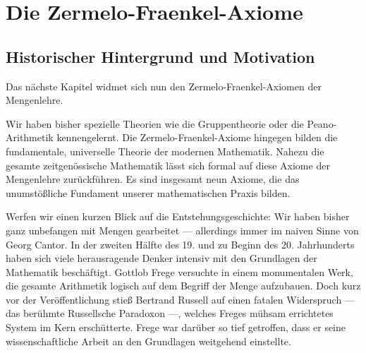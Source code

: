 \begin{ai-global-state-checkpoint-invisible-content}
\end{ai-global-state-checkpoint-invisible-content}

\section{Die Zermelo-Fraenkel-Axiome}
\subsection{Historischer Hintergrund und Motivation}

\begin{spoken-clean}[01:09:50 - 01:12:50]
Das nächste Kapitel widmet sich nun den Zermelo-Fraenkel-Axiomen der Mengenlehre.

Wir haben bisher spezielle Theorien wie die Gruppentheorie oder die Peano-Arithmetik kennengelernt. Die Zermelo-Fraenkel-Axiome hingegen bilden die fundamentale, universelle Theorie der modernen Mathematik. Nahezu die gesamte zeitgenössische Mathematik lässt sich formal auf diese Axiome der Mengenlehre zurückführen. Es sind insgesamt neun Axiome, die das unumstößliche Fundament unserer mathematischen Praxis bilden.

Werfen wir einen kurzen Blick auf die Entstehungsgeschichte: Wir haben bisher ganz unbefangen mit Mengen gearbeitet --- allerdings immer im naiven Sinne von Georg Cantor. In der zweiten Hälfte des 19. und zu Beginn des 20. Jahrhunderts haben sich viele herausragende Denker intensiv mit den Grundlagen der Mathematik beschäftigt. Gottlob Frege versuchte in einem monumentalen Werk, die gesamte Arithmetik logisch auf dem Begriff der Menge aufzubauen. Doch kurz vor der Veröffentlichung stieß Bertrand Russell auf einen fatalen Widerspruch --- das berühmte Russellsche Paradoxon ---, welches Freges mühsam errichtetes System im Kern erschütterte. Frege war darüber so tief getroffen, dass er seine wissenschaftliche Arbeit an den Grundlagen weitgehend einstellte.
\end{spoken-clean}


